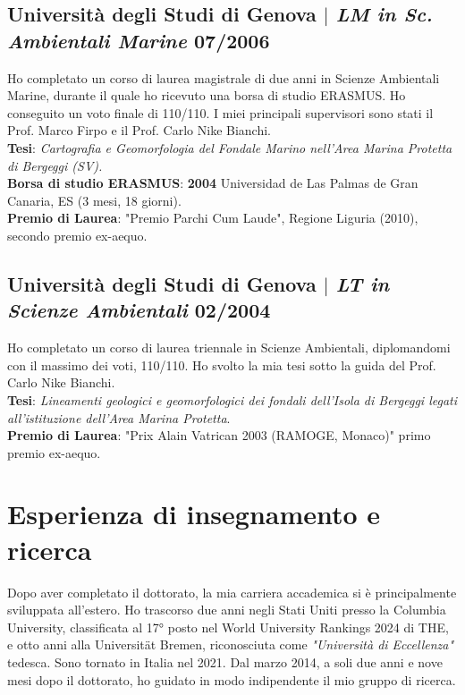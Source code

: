 \documentclass[11pt]{article}
\begin{document}
\subsection{Università degli Studi di Genova $|$ {\normalfont\textit{LM in Sc. Ambientali Marine}} \hfill 07/2006}
{\footnotesize Ho completato un corso di laurea magistrale di due anni in Scienze Ambientali Marine, durante il quale ho ricevuto una borsa di studio ERASMUS. Ho conseguito un voto finale di 110/110. I miei principali supervisori sono stati il Prof. Marco Firpo e il Prof. Carlo Nike Bianchi. \\
\textbf{Tesi}: \textit{Cartografia e Geomorfologia del Fondale Marino nell'Area Marina Protetta di Bergeggi (SV).}\\
\textbf{Borsa di studio ERASMUS}: \textbf{2004} Universidad de Las Palmas de Gran Canaria, ES (3 mesi, 18 giorni).\\
\textbf{Premio di Laurea}: "Premio Parchi Cum Laude", Regione Liguria (2010), secondo premio ex-aequo.}
\bigskip

\subsection{Università degli Studi di Genova $|$ {\normalfont\textit{LT in Scienze Ambientali}} \hfill 02/2004}
{\footnotesize Ho completato un corso di laurea triennale in Scienze Ambientali, diplomandomi con il massimo dei voti, 110/110. Ho svolto la mia tesi sotto la guida del Prof. Carlo Nike Bianchi. \\
\textbf{Tesi}: \textit{Lineamenti geologici e geomorfologici dei fondali dell’Isola di Bergeggi legati all’istituzione dell’Area Marina Protetta}.\\
\textbf{Premio di Laurea}: "Prix Alain Vatrican 2003 (RAMOGE, Monaco)" primo premio ex-aequo.}

\newpage
\section{Esperienza di insegnamento e ricerca}
{\normalfont Dopo aver completato il dottorato, la mia carriera accademica si è principalmente sviluppata all'estero. Ho trascorso due anni negli Stati Uniti presso la Columbia University, classificata al 17° posto nel World University Rankings 2024 di THE, e otto anni alla Universität Bremen, riconosciuta come \textit{"Università di Eccellenza"} tedesca. Sono tornato in Italia nel 2021. Dal marzo 2014, a soli due anni e nove mesi dopo il dottorato, ho guidato in modo indipendente il mio gruppo di ricerca.}\\
\end{document}
